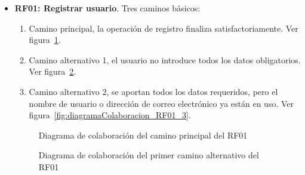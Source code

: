 \begin{itemize}
	\item \textbf{RF01: Registrar usuario}. Tres caminos básicos: 
	\begin{enumerate}
		\item Camino principal, la operación de registro finaliza satisfactoriamente. Ver figura~\ref{fig:diagramaColaboracion_RF01_1}.
		\item Camino alternativo 1, el usuario no introduce todos los datos obligatorios. Ver figura~\ref{fig:diagramaColaboracion_RF01_2}.
		\item Camino alternativo 2, se aportan todos los datos requeridos, pero el nombre de usuario o dirección de correo electrónico ya están en uso. Ver figura~\ref{fig:diagramaColaboracion_RF01_3}.
	\end{enumerate}
	\begin{figure} [!htb]
		\centering
		\caption{Diagrama de colaboración del camino principal del RF01}
		\label{fig:diagramaColaboracion_RF01_1}
	\end{figure}
	\begin{figure} [!htb]
		\centering
		\caption{Diagrama de colaboración del primer camino alternativo del RF01}
		\label{fig:diagramaColaboracion_RF01_2}
	\end{figure}
	\begin{figure} [!htb]
		\centering

\end{figure}
\end{itemize}
